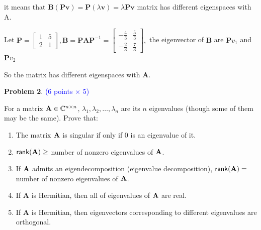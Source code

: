 \documentclass[english,onecolumn]{IEEEtran}
\newcommand{\bA}{{\bf A}}
\def\A{\mathbf{A}}
\begin{document}
\begin{enumerate}
    it means that $\mathbf{B}(\mathbf{P} \mathbf{v}) = \mathbf{P}(\lambda \mathbf{v}) = \lambda \mathbf{P} \mathbf{v}$
    matrix has different eigenspaces with $\mathrm{A}$.
    
Let $\mathbf{P} = \left[\begin{array}{ll}1 & 5 \\ 2 & 1\end{array}\right], \mathbf{B} = \mathbf{P A P}^{-1} =
\left[\begin{array}{cc}-\frac{4}{3} & \frac{5}{3} \\ -\frac{2}{3} & \frac{7}{3}\end{array}\right],
$ the eigenvector of $\mathbf{B}$ are $\mathbf{P} v_1$ and $\mathbf{P} v_2$ 

So the matrix has different eigenspaces with $\mathbf{A}$.
\end{enumerate}


\newpage
\noindent\textbf{Problem 2}. \textcolor{blue}{(6 points $\times$ 5)}

\noindent
For a matrix ${\bf A}\in \mathbb{C}^{n\times n}$, 
$\lambda_1, \lambda_2, \ldots, \lambda_n$   are its $n$ eigenvalues 
(though some of them may be the same). 
Prove that:
\begin{enumerate}
    \item The matrix ${\bf A}$ is singular if only if 0 is an eigenvalue of it.
    \item ${\sf rank}({\bf A}) \geq$ number of nonzero eigenvalues of ${\bf A}$.
    \item If ${\bf A}$ admits an  eigendecomposition (eigenvalue decomposition), ${\sf rank}({\bf A}) =$ number of nonzero eigenvalues of ${\bf A}$.
    \item If $\A$ is Hermitian, then all of eigenvalues of $\bA$ are real.
    \item If $\A$ is Hermitian, then eigenvectors corresponding to different eigenvalues are orthogonal.
\end{enumerate}
\end{document}
